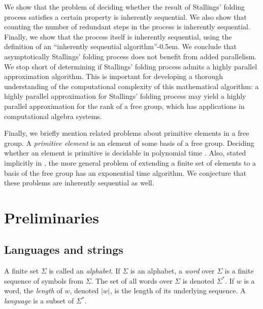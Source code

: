 \documentclass{article}
\begin{document}
%
We show that the problem of deciding whether the result of Stallings' folding process satisfies a certain property is inherently sequential.
We also show that counting the number of redundant steps in the process is inherently sequential.
Finally, we show that the process itself is inherently sequential, using the definition of an ``inherently sequential algorithm''\kern-0.5em.
We conclude that asymptotically Stallings' folding process does not benefit from added parallelism.
We stop short of determining if Stallings' folding process admits a highly parallel approximation algorithm.
This is important for developing a thorough understanding of the computational complexity of this mathematical algorithm: a highly parallel approximation for Stallings' folding process may yield a highly parallel approximation for the rank of a free group, which has applications in computational algebra systems.

Finally, we briefly mention related problems about primitive elements in a free group.
A \emph{primitive element} is an element of some basis of a free group.
Deciding whether an element is primitive is decidable in polynomial time \autocite[Corollary~3.10]{rvw07}.
Also, stated implicitly in \autocite[Theorem~4.4]{cg12}, the more general problem of extending a finite set of elements to a basis of the free group has an exponential time algorithm.
We conjecture that these problems are inherently sequential as well.

\section{Preliminaries}

\subsection{Languages and strings}

A finite set $\Sigma$ is called an \emph{alphabet}.
If $\Sigma$ is an alphabet, a \emph{word} over $\Sigma$ is a finite sequence of symbols from $\Sigma$.
The set of all words over $\Sigma$ is denoted $\Sigma^*$.
If $w$ is a word, the \emph{length} of $w$, denoted $|w|$, is the length of its underlying sequence.
A \emph{language} is a subset of $\Sigma^*$.
\end{document}

